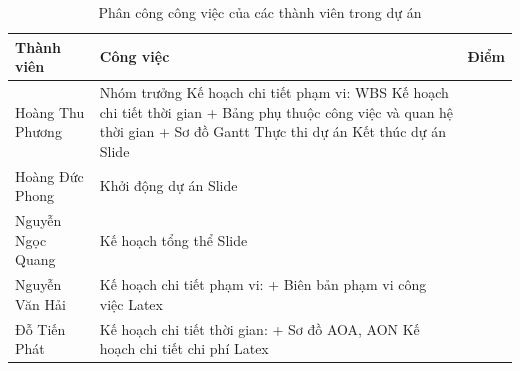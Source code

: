 \begin{table}[h]
    \centering
    \begin{tabular}{|>{\centering\arraybackslash}m{4cm}|p{9cm}|c|}
    \hline
    \textbf{Thành viên} & \textbf{Công việc} & \textbf{Điểm} \\ \hline
    Hoàng Thu Phương & Nhóm trưởng \newline
    Kế hoạch chi tiết phạm vi: WBS \newline
    Kế hoạch chi tiết thời gian \newline
    + Bảng phụ thuộc công việc và quan hệ thời gian \newline
    + Sơ đồ Gantt \newline
    Thực thi dự án \newline
    Kết thúc dự án \newline
    Slide
     & \\ \hline
     Hoàng Đức Phong & Khởi động dự án \newline
     Slide
      & \\ \hline
    Nguyễn Ngọc Quang & Kế hoạch tổng thể \newline
    Slide
     & \\ \hline
     Nguyễn Văn Hải & Kế hoạch chi tiết phạm vi: \newline
     + Biên bản phạm vi công việc \newline
     Latex
     & \\ \hline
    Đỗ Tiến Phát & Kế hoạch chi tiết thời gian: \newline
    + Sơ đồ AOA, AON \newline
    Kế hoạch chi tiết chi phí \newline
    Latex
     & \\ \hline
    \end{tabular}
    \caption{Phân công công việc của các thành viên trong dự án}
    \label{tab:phancong}
\end{table}